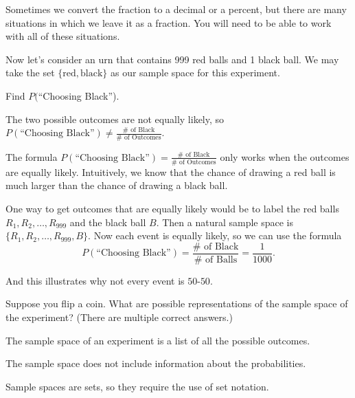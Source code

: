 \documentclass{ximera}
\begin{document}
Sometimes we convert the fraction to a decimal or a percent, but there are many situations in which we leave it as a fraction. You will need to be able to work with all of these situations.

Now let's consider an urn that contains 999 red balls and 1 black ball. We may take the set $\{ \text{red}, \text{black} \}$ as our sample space for this experiment. 

\begin{question}
Find $P($``Choosing Black'').

    \begin{multipleChoice}
      \end{multipleChoice}
    \begin{hint}
    The two possible outcomes are not equally likely, so $P(\text{``Choosing Black''})\ne\frac{\#\text{ of Black}}{\#\text{ of Outcomes}}$.
    \end{hint}

\end{question}

The formula $P(\text{``Choosing Black''})=\frac{\#\text{ of Black}}{\#\text{ of Outcomes}}$ only works when the outcomes are equally likely. 
Intuitively, we know that the chance of drawing a red ball is much larger than the chance of drawing a black ball. 

One way to get outcomes that are equally likely would be to label the red balls $R_1,R_2,\ldots, R_{999}$ and the black ball $B$. Then a natural sample space is $\{R_1,R_2,\ldots,R_{999},B\}$. Now each event is equally likely, so we can use the formula 
\[
P(\text{``Choosing Black''})=\frac{\#\text{ of Black}}{\#\text{ of Balls}}=\frac{1}{1000}.
\]

And this illustrates why not every event is $50$-$50$.


\begin{question}
Suppose you flip a coin. What are possible representations of the sample space of the experiment? (There are multiple correct answers.)

    \begin{multipleChoice}
      \end{multipleChoice}
    \begin{hint}
    The sample space of an experiment is a list of all the possible outcomes.
    \end{hint}
    \begin{hint}
    The sample space does not include information about the probabilities.
    \end{hint}
    \begin{hint}
    Sample spaces are sets, so they require the use of set notation.
    \end{hint}

\end{question}
\end{document}
